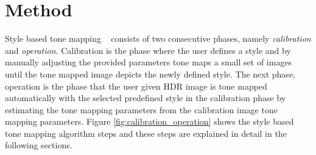 

\section{Method}
Style based tone mapping ~\cite{akyuz2013style} consists of two consecutive phases, namely \emph{calibration} and \emph{operation}. Calibration is the phase where the user defines a style and by manually adjusting the provided parameters tone maps a small set of images until the tone mapped image depicts the newly defined style. The next phase, operation is the phase that the user given HDR image is tone mapped automatically with the selected predefined style in the calibration phase by estimating the tone mapping parameters from the calibration image tone mapping parameters. Figure \ref{fig:calibration_operation} shows the style based tone mapping algorithm steps and these steps are explained in detail in the following sections.


